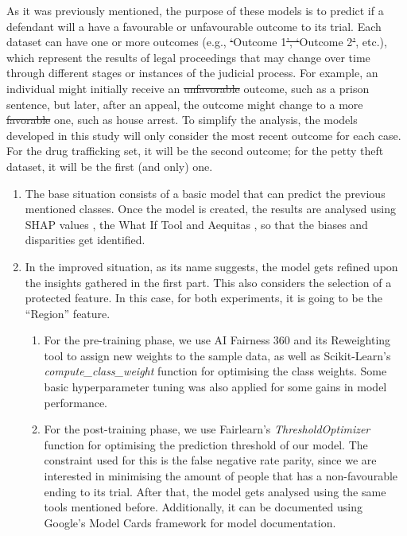 \documentclass[fleqn,10pt]{wlscirep}
\providecommand{\DIFadd}[1]{{\protect\color{blue}\uwave{#1}}} %
\providecommand{\DIFdel}[1]{{\protect\color{red}\sout{#1}}}                      %
\providecommand{\DIFaddbegin}{} %
\providecommand{\DIFaddend}{} %
\providecommand{\DIFdelbegin}{} %
\providecommand{\DIFdelend}{} %
\begin{document}
As it was previously mentioned, the purpose of these models is to predict if a defendant will a have a favourable or unfavourable outcome to its trial. Each dataset can have one or more outcomes (e.g., \DIFdelbegin \DIFdel{‘}\DIFdelend \DIFaddbegin \DIFadd{``}\DIFaddend Outcome 1\DIFdelbegin \DIFdel{’, ‘}\DIFdelend \DIFaddbegin \DIFadd{'', ``}\DIFaddend Outcome 2\DIFdelbegin \DIFdel{’}\DIFdelend \DIFaddbegin \DIFadd{''}\DIFaddend , etc.), which represent the results of legal proceedings that may change over time through different stages or instances of the judicial process. For example, an individual might initially receive an \DIFdelbegin \DIFdel{unfavorable }\DIFdelend \DIFaddbegin \DIFadd{unfavourable }\DIFaddend outcome, such as a prison sentence, but later, after an appeal, the outcome might change to a more \DIFdelbegin \DIFdel{favorable }\DIFdelend \DIFaddbegin \DIFadd{favourable }\DIFaddend one, such as house arrest. To simplify the analysis, the models developed in this study will only consider the most recent outcome for each case. For the drug trafficking set, it will be the second outcome; for the petty theft dataset, it will be the first (and only) one.

\begin{enumerate}
    \item The base situation consists of a basic model that can predict the previous mentioned classes. Once the model is created, the results are analysed using SHAP values \cite{NIPS2017_7062}, the What If Tool \cite{wexler_2018} and Aequitas \cite{DBLP:journals/corr/abs-1811-05577}, so that the biases and disparities get identified.

    \item In the improved situation, as its name suggests, the model gets refined upon the insights gathered in the first part. This also considers the selection of a protected feature. In this case, for both experiments, it is going to be the ``Region'' feature.

    \begin{enumerate}
        \item For the pre-training phase, we use AI Fairness 360 \cite{aif360-oct-2018} and its Reweighting tool to assign new weights to the sample data, as well as Scikit-Learn's \cite{scikit-learn} \textit{compute\_class\_weight} function for optimising the class weights. Some basic hyperparameter tuning was also applied for some gains in model performance.

        \item For the post-training phase, we use Fairlearn's \textit{ThresholdOptimizer} function for optimising the prediction threshold of our model. The constraint used for this is the false negative rate parity, since we are interested in minimising the amount of people that has a non-favourable ending to its trial. After that, the model gets analysed using the same tools mentioned before. Additionally, it can be documented using Google's Model Cards framework for model documentation.
    \end{enumerate}
\end{enumerate}
\end{document}
